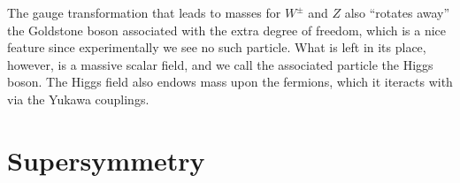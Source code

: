 The gauge transformation that leads to masses for $W^\pm$ and $Z$ also ``rotates
away'' the Goldstone boson associated with the extra degree of freedom, which
is a nice feature since experimentally we see no such particle.  What is left
in its place, however, is a massive scalar field, and we call the associated
particle the Higgs boson.  The Higgs field also endows mass upon the fermions,
which it iteracts with via the Yukawa couplings.






 
 
 
\section{Supersymmetry}

